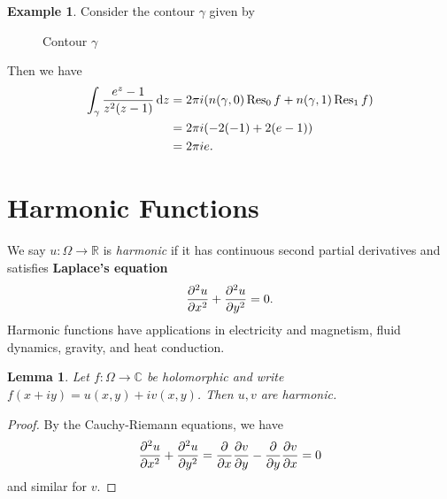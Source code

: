 \documentclass[leqno, openany]{memoir}
\newtheorem{lem}[thm]{Lemma}
\theoremstyle{definition}
\newtheorem{exm}[thm]{Example}
\theoremstyle{remark}
\theoremstyle{plain}
\theoremstyle{definition}
\theoremstyle{remark}
\newcommand{\R}{\mathbb{R}}
\newcommand{\C}{\mathbb{C}}
\begin{document}
\begin{exm}
    Consider the contour $\gamma$ given by
    \begin{figure}[H]
    \begin{center}
    \end{center}
    \caption{Contour $\gamma$}%
    \label{fig:contour-7}
    \end{figure}
    Then we have 
    \begin{align*} 
        \int_{\gamma} \frac{e^z-1}{z^2(z-1)} \dd{z} &= 2 \pi i (n(\gamma, 0) \Res_0 f + n(\gamma, 1) \Res_1 f) \\
                                                    &= 2 \pi i (-2(-1) + 2(e-1)) \\
                                                    &= 2 \pi i e.
    \end{align*}
\end{exm}


\section{Harmonic Functions}%
\label{sec:harmonic_functions}

We say $u \colon \Omega \to \R$ is \textit{harmonic} if it has continuous second partial derivatives and satisfies \textbf{Laplace's equation}
\[ \pdv[2]{u}{x} + \pdv[2]{u}{y} = 0. \]
Harmonic functions have applications in electricity and magnetism, fluid dynamics, gravity, and heat conduction.

\begin{lem}
    Let $f \colon \Omega \to \C$ be holomorphic and write $f(x+iy) = u(x,y) + iv(x,y)$. Then $u,v$ are harmonic.
\end{lem}

\begin{proof}
    By the Cauchy-Riemann equations, we have
    \[ \pdv[2]{u}{x} + \pdv[2]{u}{y} = \pdv{x} \pdv{v}{y} - \pdv{y} \pdv{v}{x} = 0 \]
    and similar for $v$.
\end{proof}
\end{document}
